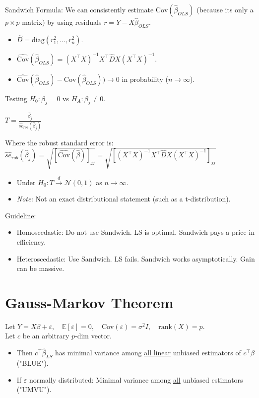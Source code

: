 Sandwich Formula: We can consistently estimate $\text{Cov}(\hat{\beta}_{OLS})$ (because its only a $p \times p$ matrix) by using residuals $r = Y - X\hat{\beta}_{OLS}$.
\begin{itemize}
    \item $\hat{D} = \text{diag}(r_1^2, \dots, r_n^2)$.
    \item $\widehat{\text{Cov}}(\hat{\beta}_{OLS}) = (X^\top X)^{-1} X^\top \hat{D} X (X^\top X)^{-1}$.
    \item $\widehat{\text{Cov}}(\hat{\beta}_{OLS}) - \text{Cov}(\hat{\beta}_{OLS})) \to 0$ in probability ($n \to \infty$).
\end{itemize}

Testing $H_0: \beta_j = 0$ vs $H_A: \beta_j \neq 0$.

$T = \frac{\hat{\beta}_j}{\widehat{se}_{rob}(\hat{\beta}_j)}$

Where the robust standard error is:
$\widehat{se}_{rob}(\hat{\beta}_j) = \sqrt{[\widehat{\text{Cov}}(\hat{\beta})]_{jj}} = \sqrt{ [(X^\top X)^{-1} X^\top \hat{D} X (X^\top X)^{-1}]_{jj} }$

\begin{itemize}
    \item Under $H_0: T \xrightarrow{d} \mathcal{N}(0,1)$ as $n \to \infty$.
    \item \textit{Note:} Not an exact distributional statement (such as a t-distribution).
\end{itemize}
Guideline:
\begin{itemize}
    \item Homoscedastic: Do not use Sandwich. LS is optimal. Sandwich pays a price in efficiency.
    \item Heteroscedastic: Use Sandwich. LS fails. Sandwich works asymptotically. Gain can be massive.
\end{itemize}

\section{Gauss-Markov Theorem}
Let $Y = X\beta + \varepsilon, \quad \mathbb{E}[\varepsilon]=0, \quad \text{Cov}(\varepsilon) = \sigma^2 I, \quad \text{rank}(X)=p$.
\\ Let $c$ be an arbitrary $p$-dim vector.
\begin{itemize}
    \item Then $c^\top \hat{\beta}_{LS}$ has minimal variance among \underline{all linear} unbiased estimators of $c^\top \beta$ ("BLUE").
    \item If $\varepsilon$ normally distributed: Minimal variance among \underline{all} unbiased estimators ("UMVU").
\end{itemize}

